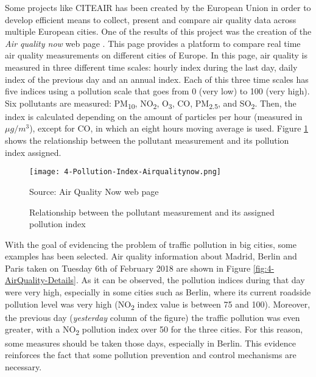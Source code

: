 Some projects like \ac{CITEAIR} has been created by the European Union \cite{citeair} in order to develop efficient means to collect, present and compare air quality data across multiple European cities. One of the results of this project was the creation of the \emph{Air quality now} web page \cite{airqualitynow}. This page provides a platform to compare real time air quality measurements on different cities of Europe. In this page, air quality is measured in three different time scales: hourly index during the last day, daily index of the previous day and an annual index. Each of this three time scales has five indices using a pollution scale that goes from 0 (very low) to 100 (very high). Six pollutants are measured: PM\textsubscript{10}, NO\textsubscript{2}, O\textsubscript{3}, CO, PM\textsubscript{2.5}, and SO\textsubscript{2}. Then, the index is calculated depending on the amount of particles per hour (measured in $\mu g/m^3$), except for CO, in which an eight hours moving average is used. Figure \ref{fig:4-Pollution-Index-Airqualitynow} shows the relationship between the pollutant measurement and its pollution index assigned.

\begin{figure}[!h]
	\begin{center}
		\texttt{[image: 4-Pollution-Index-Airqualitynow.png]}	
		\caption{Relationship between the pollutant measurement and its assigned pollution index}{Source: Air Quality Now web page \cite{airqualitynow}}
		\label{fig:4-Pollution-Index-Airqualitynow}
	\end{center}
\end{figure}

With the goal of evidencing the problem of traffic pollution in big cities, some examples has been selected. Air quality information about Madrid, Berlin and Paris taken on Tuesday 6th of February 2018 are shown in Figure \ref{fig:4-AirQuality-Details}.
As it can be observed, the pollution indices during that day were very high, especially in some cities such as Berlin, where its current roadside pollution level was very high (NO\textsubscript{2} index value is between 75 and 100). Moreover, the previous day (\textit{yesterday} column of the figure) the traffic pollution was even greater, with a NO\textsubscript{2} pollution index over 50 for the three cities. For this reason, some measures should be taken those days, especially in Berlin. This evidence reinforces the fact that some pollution prevention and control mechanisms are necessary.

